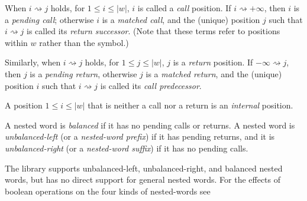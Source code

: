 When $i \rightsquigarrow j$ holds, for $1 \leq i \leq |w|$, $i$ is called a
\textsl{call} position. If $i \rightsquigarrow +\infty$, then $i$ is a
\textsl{pending call}; otherwise $i$ is a \textsl{matched call}, and the
(unique) position $j$ such that $i \rightsquigarrow j$ is called its
\textsl{return successor}. (Note that these terms refer to positions within
$w$ rather than the symbol.)

Similarly, when $i \rightsquigarrow j$ holds, for $1 \leq j \leq |w|$, $j$
is a \textsl{return} position. If $-\infty \rightsquigarrow j$, then $j$ is
a \textsl{pending return}, otherwise $j$ is a \textsl{matched return}, and
the (unique) position $i$ such that $i \rightsquigarrow j$ is called its
\textsl{call predecessor}.

A position $1 \leq i \leq |w|$ that is neither a call nor a return is an
\textsl{internal} position.

A nested word is \textsl{balanced} if it has no pending calls
or returns.  A nested word is \textsl{unbalanced-left} (or a
\textsl{nested-word prefix}) if it has pending returns, and it is
\textsl{unbalanced-right} (or a \textsl{nested-word suffix})
if it has no pending calls.



The library supports unbalanced-left, unbalanced-right, and balanced
nested words, but has no direct support for general nested words.  For the
effects of boolean operations on the four kinds of nested-words see %


